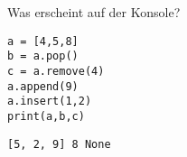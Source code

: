 \question[3]
Was erscheint auf der Konsole?
\begin{lstlisting}
a = [4,5,8]
b = a.pop()
c = a.remove(4)
a.append(9)
a.insert(1,2)
print(a,b,c)
\end{lstlisting}
\begin{solutionbox}{1cm}
\texttt{[5, 2, 9] 8 None}
\end{solutionbox}

